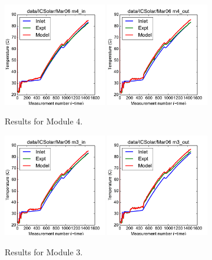 \documentclass{article}
\begin{document}
\clearpage
\begin{figure}[!ht]
\centering
\includegraphics[width=0.4\textwidth]{../../data/ICSolar/images/Mar06_m4_in.pdf}\hspace{0.05\textwidth}
\includegraphics[width=0.4\textwidth]{../../data/ICSolar/images/Mar06_m4_out.pdf}\hspace{0.05\textwidth}\\
\caption{Results for Module 4.}\end{figure}
\begin{figure}[!ht]
\centering
\includegraphics[width=0.4\textwidth]{../../data/ICSolar/images/Mar06_m3_in.pdf}\hspace{0.05\textwidth}
\includegraphics[width=0.4\textwidth]{../../data/ICSolar/images/Mar06_m3_out.pdf}\hspace{0.05\textwidth}\\
\caption{Results for Module 3.}\end{figure}
\end{document}
